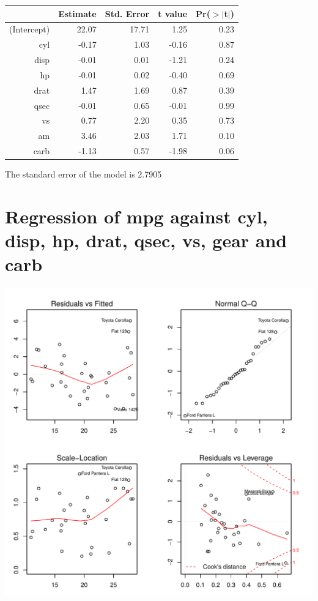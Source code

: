 \documentclass{article}\usepackage[]{graphicx}\usepackage[]{color}
\makeatletter
\def\maxwidth{ %
  \ifdim\Gin@nat@width>\linewidth
    \linewidth
  \else
    \Gin@nat@width
  \fi
}
\newenvironment{knitrout}{}{} %
\makeatother
\begin{document}
\begin{table}[ht]
\centering
\begin{tabular}{rrrrr}
  \hline
 & Estimate & Std. Error & t value & Pr($>$$|$t$|$) \\ 
  \hline
(Intercept) & 22.07 & 17.71 & 1.25 & 0.23 \\ 
  cyl & -0.17 & 1.03 & -0.16 & 0.87 \\ 
  disp & -0.01 & 0.01 & -1.21 & 0.24 \\ 
  hp & -0.01 & 0.02 & -0.40 & 0.69 \\ 
  drat & 1.47 & 1.69 & 0.87 & 0.39 \\ 
  qsec & -0.01 & 0.65 & -0.01 & 0.99 \\ 
  vs & 0.77 & 2.20 & 0.35 & 0.73 \\ 
  am & 3.46 & 2.03 & 1.71 & 0.10 \\ 
  carb & -1.13 & 0.57 & -1.98 & 0.06 \\ 
   \hline
\end{tabular}
\end{table}




The standard error of the model is 2.7905

\newpage

\section{Regression of mpg against cyl, disp, hp, drat, qsec, vs, gear and carb }
\begin{knitrout}
\color{fgcolor}

{\centering \includegraphics[width=\maxwidth]{figure/lm-cyl-disp-hp-drat-qsec-vs-gear-carb} 

}



\end{knitrout}
\end{document}
